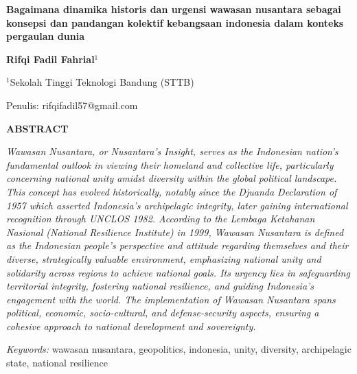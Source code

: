 \documentclass[12pt, a4paper]{article}
\newcommand{\makecustomtitle}[1]{\begin{center}\large\bfseries\fontsize{12pt}{14pt}\MakeUppercase{#1}\end{center}\vspace{0.5cm}}
\begin{document}
\begin{titlepage}
    \centering
    \vspace*{2cm}
    {\LARGE\bfseries Bagaimana dinamika historis dan urgensi wawasan nusantara sebagai konsepsi dan pandangan kolektif kebangsaan indonesia dalam konteks pergaulan dunia\par}
    \vspace{1cm}
    {\large\bfseries Rifqi Fadil Fahrial$^1$\par}
    \vspace{0.5cm}
    \normalsize
    $^1$Sekolah Tinggi Teknologi Bandung (STTB)\par
    \vspace{0.5cm}
    Penulis: rifqifadil57@gmail.com
    \vfill
\end{titlepage}

\makecustomtitle{ABSTRACT}
\begin{minipage}{\textwidth}
\singlespacing
\justifying
\textit{\small
Wawasan Nusantara, or Nusantara's Insight, serves as the Indonesian nation's fundamental outlook in viewing their homeland and collective life, particularly concerning national unity amidst diversity within the global political landscape. This concept has evolved historically, notably since the Djuanda Declaration of 1957 which asserted Indonesia's archipelagic integrity, later gaining international recognition through UNCLOS 1982. According to the \textit{Lembaga Ketahanan Nasional} (National Resilience Institute) in 1999, Wawasan Nusantara is defined as the Indonesian people's perspective and attitude regarding themselves and their diverse, strategically valuable environment, emphasizing national unity and solidarity across regions to achieve national goals. Its urgency lies in safeguarding territorial integrity, fostering national resilience, and guiding Indonesia's engagement with the world. The implementation of Wawasan Nusantara spans political, economic, socio-cultural, and defense-security aspects, ensuring a cohesive approach to national development and sovereignty.}
\vspace{0.5em}
\par\noindent
\textit{Keywords:} wawasan nusantara, geopolitics, indonesia, unity, diversity, archipelagic state, national resilience
\end{minipage}
\vspace{1cm}
\end{document}
